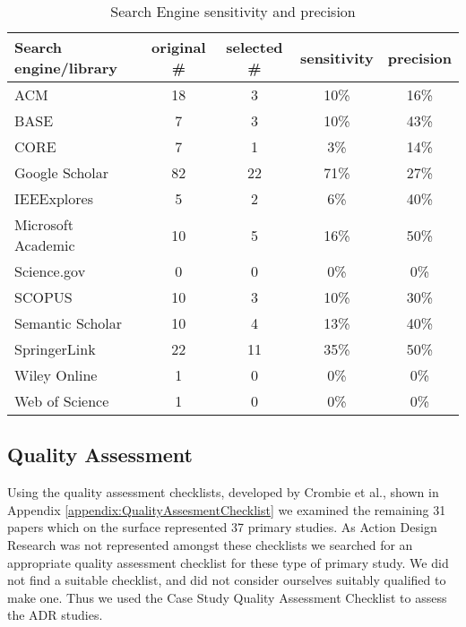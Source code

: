 \begin{table}[h]
    \begin{center}
        \begin{tabular}{ | l | c | c | c | c |} 
            \hline
            Search engine/library     & original \# & selected \# & sensitivity & precision\\
            \hline
            \hline
            ACM                        & 18          & 3           & 10\%        &  16\%    \\
            BASE                       & 7           & 3           & 10\%        &  43\%    \\
            CORE                       & 7           & 1           &  3\%        &  14\%    \\
            Google Scholar             & 82          & 22          & 71\%        &  27\%    \\
            IEEExplores                & 5           & 2           &  6\%        &  40\%    \\
            Microsoft Academic         & 10          & 5           & 16\%        &  50\%    \\
            Science.gov                & 0           & 0           &  0\%        &   0\%    \\
            SCOPUS                     & 10          & 3           & 10\%        &  30\%    \\
            Semantic Scholar           & 10          & 4           & 13\%        &  40\%    \\
            SpringerLink               & 22          & 11          & 35\%        &  50\%    \\
            Wiley Online               & 1           & 0           &  0\%        &   0\%    \\
            Web of Science             & 1           & 0           &  0\%        &   0\%    \\
            \hline
        \end{tabular}
    \end{center}
    \caption{Search Engine sensitivity and precision}
    \label{table:sensitivity_precision}
\end{table}


\subsection{Quality Assessment}
Using the quality assessment checklists, developed by Crombie et al.\cite{crombie1997pocket}, shown in Appendix \ref{appendix:QualityAssesmentChecklist} we examined the remaining 31 papers which on the surface represented 37 primary studies.
As Action Design Research was not represented amongst these checklists we searched for an appropriate quality assessment checklist for these type of primary study.
We did not find a suitable checklist, and did not consider ourselves suitably qualified to make one.
Thus we used the Case Study Quality Assessment Checklist to assess the ADR studies.

